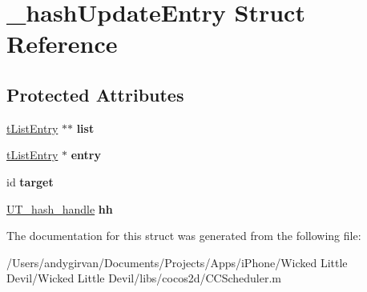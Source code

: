 \hypertarget{struct__hash_update_entry}{\section{\-\_\-hash\-Update\-Entry Struct Reference}
\label{struct__hash_update_entry}
}
\subsection*{Protected Attributes}
\begin{DoxyCompactItemize}
\item 
\hypertarget{struct__hash_update_entry_a2458362fa5e02fd614fdbb0ee298ecb9}{\hyperlink{struct__list_entry}{t\-List\-Entry} $\ast$$\ast$ {\bfseries list}}\label{struct__hash_update_entry_a2458362fa5e02fd614fdbb0ee298ecb9}

\item 
\hypertarget{struct__hash_update_entry_a10d768b6279682ca73cfde8702788a6a}{\hyperlink{struct__list_entry}{t\-List\-Entry} $\ast$ {\bfseries entry}}\label{struct__hash_update_entry_a10d768b6279682ca73cfde8702788a6a}

\item 
\hypertarget{struct__hash_update_entry_a59e46e494605bb1a91eea5a25eef0941}{id {\bfseries target}}\label{struct__hash_update_entry_a59e46e494605bb1a91eea5a25eef0941}

\item 
\hypertarget{struct__hash_update_entry_aa81fb210b05621f4aaa098a44a156e49}{\hyperlink{struct_u_t__hash__handle}{U\-T\-\_\-hash\-\_\-handle} {\bfseries hh}}\label{struct__hash_update_entry_aa81fb210b05621f4aaa098a44a156e49}

\end{DoxyCompactItemize}


The documentation for this struct was generated from the following file\-:\begin{DoxyCompactItemize}
\item 
/\-Users/andygirvan/\-Documents/\-Projects/\-Apps/i\-Phone/\-Wicked Little Devil/\-Wicked Little Devil/libs/cocos2d/C\-C\-Scheduler.\-m\end{DoxyCompactItemize}
